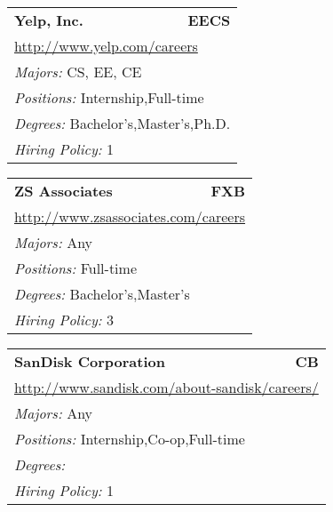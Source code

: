 \documentclass[twoside]{article}
\begin{document}
\begin{center}
\begin{multicols}{3}
\begin{FlushLeft}
\begin{minipage}{\columnwidth}
\end{minipage}
 
\begin{minipage}{\columnwidth}\begin{tabularx}{.95\columnwidth}{Xr}
                 {\Large\bf Yelp, Inc.} & {\Large\bf EECS}\\
    \multicolumn{2}{p{.95\columnwidth}}{\url{http://www.yelp.com/careers}}\\
    \multicolumn{2}{p{.95\columnwidth}}{\emph{Majors:} CS, EE, CE}\\
    \multicolumn{2}{p{.95\columnwidth}}{\emph{Positions:} Internship,Full-time}\\
    \multicolumn{2}{p{.95\columnwidth}}{\emph{Degrees:} Bachelor's,Master's,Ph.D.}\\
    \multicolumn{2}{p{.95\columnwidth}}{\emph{Hiring Policy:} 1}\\
    \end{tabularx}
    
\end{minipage}
 
\begin{minipage}{\columnwidth}\begin{tabularx}{.95\columnwidth}{Xr}
                 {\Large\bf ZS Associates} & {\Large\bf FXB}\\
    \multicolumn{2}{p{.95\columnwidth}}{\url{http://www.zsassociates.com/careers}}\\
    \multicolumn{2}{p{.95\columnwidth}}{\emph{Majors:} Any}\\
    \multicolumn{2}{p{.95\columnwidth}}{\emph{Positions:} Full-time}\\
    \multicolumn{2}{p{.95\columnwidth}}{\emph{Degrees:} Bachelor's,Master's}\\
    \multicolumn{2}{p{.95\columnwidth}}{\emph{Hiring Policy:} 3}\\
    \end{tabularx}
    
\end{minipage}
 
\begin{minipage}{\columnwidth}\begin{tabularx}{.95\columnwidth}{Xr}
                 {\Large\bf SanDisk Corporation} & {\Large\bf CB}\\
    \multicolumn{2}{p{.95\columnwidth}}{\url{http://www.sandisk.com/about-sandisk/careers/}}\\
    \multicolumn{2}{p{.95\columnwidth}}{\emph{Majors:} Any}\\
    \multicolumn{2}{p{.95\columnwidth}}{\emph{Positions:} Internship,Co-op,Full-time}\\
    \multicolumn{2}{p{.95\columnwidth}}{\emph{Degrees:} }\\
    \multicolumn{2}{p{.95\columnwidth}}{\emph{Hiring Policy:} 1}\\
    \end{tabularx}
    

\end{minipage}
\end{FlushLeft}
\end{multicols}
\end{center}
\end{document}
